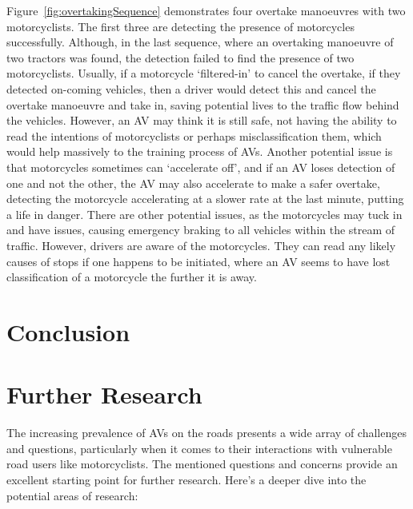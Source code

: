 \documentclass[conference]{IEEEtran}
\begin{document}
		Figure~\ref{fig:overtakingSequence} demonstrates four overtake manoeuvres with two motorcyclists. The first three are detecting the presence of motorcycles successfully. Although, in the last sequence, where an overtaking manoeuvre of two tractors was found, the detection failed to find the presence of two motorcyclists. Usually, if a motorcycle `filtered-in' to cancel the overtake, if they detected on-coming vehicles, then a driver would detect this and cancel the overtake manoeuvre and take in, saving potential lives to the traffic flow behind the vehicles. However, an AV may think it is still safe, not having the ability to read the intentions of motorcyclists or perhaps misclassification them, which would help massively to the training process of AVs. Another potential issue is that motorcycles sometimes can `accelerate off', and if an AV loses detection of one and not the other, the AV may also accelerate to make a safer overtake, detecting the motorcycle accelerating at a slower rate at the last minute, putting a life in danger. There are other potential issues, as the motorcycles may tuck in and have issues, causing emergency braking to all vehicles within the stream of traffic. However, drivers are aware of the motorcycles. They can read any likely causes of stops if one happens to be initiated, where an AV seems to have lost classification of a motorcycle the further it is away. 


		
\section{Conclusion}

\section{Further Research}
	The increasing prevalence of AVs on the roads presents a wide array of challenges and questions, particularly when it comes to their interactions with vulnerable road users like motorcyclists. The mentioned questions and concerns provide an excellent starting point for further research. Here's a deeper dive into the potential areas of research:
\end{document}
